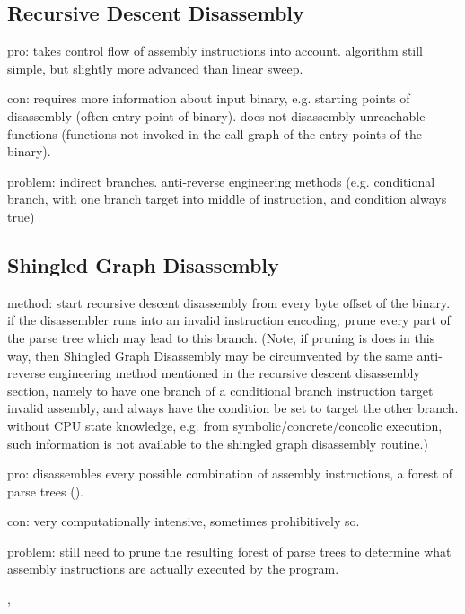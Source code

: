 \subsection{Recursive Descent Disassembly}

pro: takes control flow of assembly instructions into account. algorithm still simple, but slightly more advanced than linear sweep.

con: requires more information about input binary, e.g. starting points of disassembly (often entry point of binary). does not disassembly unreachable functions (functions not invoked in the call graph of the entry points of the binary).

problem: indirect branches. anti-reverse engineering methods (e.g. conditional branch, with one branch target into middle of instruction, and condition always true)



\subsection{Shingled Graph Disassembly}

method: start recursive descent disassembly from every byte offset of the binary. if the disassembler runs into an invalid instruction encoding, prune every part of the parse tree which may lead to this branch. (Note, if pruning is does in this way, then Shingled Graph Disassembly may be circumvented by the same anti-reverse engineering method mentioned in the recursive descent disassembly section, namely to have one branch of a conditional branch instruction target invalid assembly, and always have the condition be set to target the other branch. without CPU state knowledge, e.g. from symbolic/concrete/concolic execution, such information is not available to the shingled graph disassembly routine.)

pro: disassembles every possible combination of assembly instructions, a forest of parse trees ().

con: very computationally intensive, sometimes prohibitively so.

problem: still need to prune the resulting forest of parse trees to determine what assembly instructions are actually executed by the program.


\cite{singled_graph_disassembly}, \cite{superset_disassembly}

